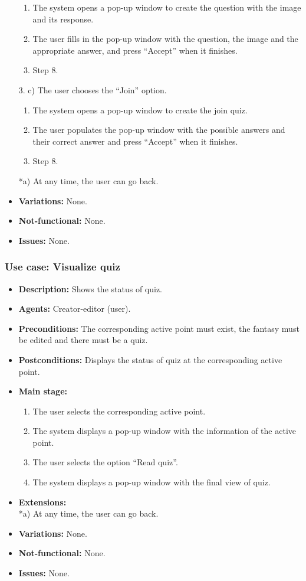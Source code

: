 \begin{itemize}
	\begin{enumerate}
		\item The system opens a pop-up window to create the question with the image and its response.
		\item The user fills in the pop-up window with the question, the image and the appropriate answer, and press ``Accept'' when it finishes.
		\item Step 8.
	\end{enumerate}
	3. c) The user chooses the ``Join'' option. %
	\begin{enumerate}
		\item The system opens a pop-up window to create the join quiz.
		\item The user populates the pop-up window with the possible answers and their correct answer and press ``Accept'' when it finishes.
		\item Step 8.
	\end{enumerate}
	*a) At any time, the user can go back.
	\item \textbf{Variations:} None.
	\item \textbf{Not-functional:} None.
	\item \textbf{Issues:} None.
\end{itemize}

\subsubsection{Use case: Visualize quiz}
\begin{itemize}
	\item \textbf{Description:} Shows the status of quiz.
	\item \textbf{Agents:} Creator-editor (user).
	\item \textbf{Preconditions:} The corresponding active point must exist, the fantasy must be edited and there must be a quiz.
	\item \textbf{Postconditions:} Displays the status of quiz at the corresponding active point.
	\item \textbf{Main stage:}
	\begin{enumerate}
		\item The user selects the corresponding active point.
		\item The system displays a pop-up window with the information of the active point.
		\item The user selects the option ``Read quiz''.
		\item The system displays a pop-up window with the final view of quiz.
	\end{enumerate}
	\item \textbf{Extensions:} \\ *a) At any time, the user can go back.
	\item \textbf{Variations:} None.
	\item \textbf{Not-functional:} None.
	\item \textbf{Issues:} None.
\end{itemize}

